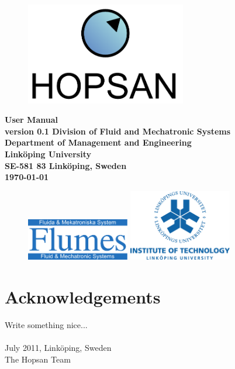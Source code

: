 

\pagestyle{empty}
\sffamily
\begin{figure}[H]
	\centering
   \includegraphics[width=70mm]{media/hopsan_logotype.pdf}
	\label{fig:hopsan_logotype}
\end{figure}
\vfill
\begin{center}
\Huge\bfseries User Manual\\
\vfill
\Large version 0.1
\vfill\vfill\vfill
\Large\bfseries\rmfamily
Division of Fluid and Mechatronic Systems\\
Department of Management and Engineering \\
Link\"{o}ping University\\
SE-581 83 Link\"{o}ping, Sweden\\
\vfill
\today

\end{center}
\vfill
\begin{figure}[H]
  \centering
  \includegraphics[width=45mm]{media/flumes_logotype.pdf}%
  \hspace{1.3in}%
  \includegraphics[width=45mm]{media/lith_logotype.pdf}
\end{figure}
\vfill
\clearpage

\section*{Acknowledgements}
Write something nice...\\ \\
\noindent
July 2011, Link\"{o}ping, Sweden\\
The Hopsan Team

